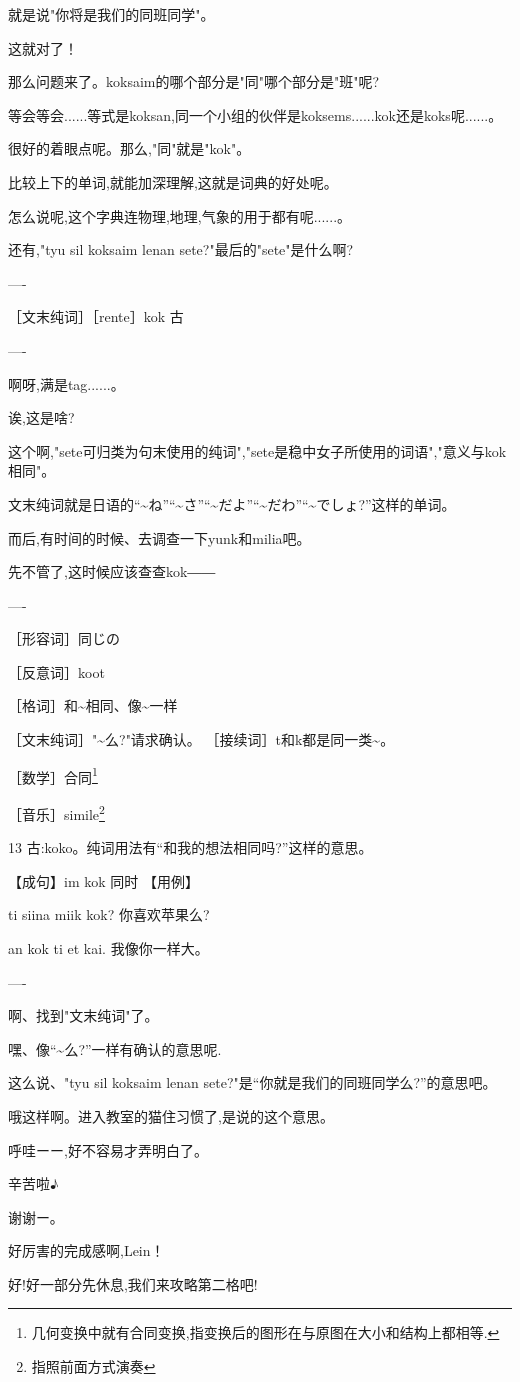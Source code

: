 就是说"你将是我们的同班同学"。


这就对了！

那么问题来了。koksaim的哪个部分是"同"哪个部分是"班"呢?



等会等会......等式是koksan,同一个小组的伙伴是koksems......kok还是koks呢......。


很好的着眼点呢。那么,"同"就是"kok"。

比较上下的单词,就能加深理解,这就是词典的好处呢。


怎么说呢,这个字典连物理,地理,气象的用于都有呢......。

还有,"tyu sil koksaim lenan sete?"最后的"sete"是什么啊?

----

［文末纯词］［rente］kok
古

----


啊呀,满是tag......。

诶,这是啥?



这个啊,"sete可归类为句末使用的纯词","sete是稳中女子所使用的词语","意义与kok相同"。

文末纯词就是日语的``\~{}ね''``\~{}さ''``\~{}だよ''``\~{}だわ''``\~{}でしょ?''这样的单词。

而后,有时间的时候、去调查一下yunk和milia吧。

先不管了,这时候应该查查kok――

----

［形容词］同じの

［反意词］koot

［格词］和\~{}相同、像\~{}一样

［文末纯词］"\~{}么?"请求确认。
［接续词］t和k都是同一类\~{}。

［数学］合同\footnote{几何变换中就有合同变换,指变换后的图形在与原图在大小和结构上都相等.}

［音乐］simile\footnote{指照前面方式演奏}

13 古:koko。纯词用法有``和我的想法相同吗?''这样的意思。

【成句】im kok 同时
【用例】

ti siina miik kok? 你喜欢苹果么?

an kok ti et kai. 我像你一样大。


----

啊、找到"文末纯词"了。

嘿、像``\~{}么?''一样有确认的意思呢.

这么说、"tyu sil koksaim lenan sete?"是``你就是我们的同班同学么?''的意思吧。

哦这样啊。进入教室的猫住习惯了,是说的这个意思。

呼哇ーー,好不容易才弄明白了。


辛苦啦♪


谢谢ー。

好厉害的完成感啊,Lein！

好!好一部分先休息,我们来攻略第二格吧!